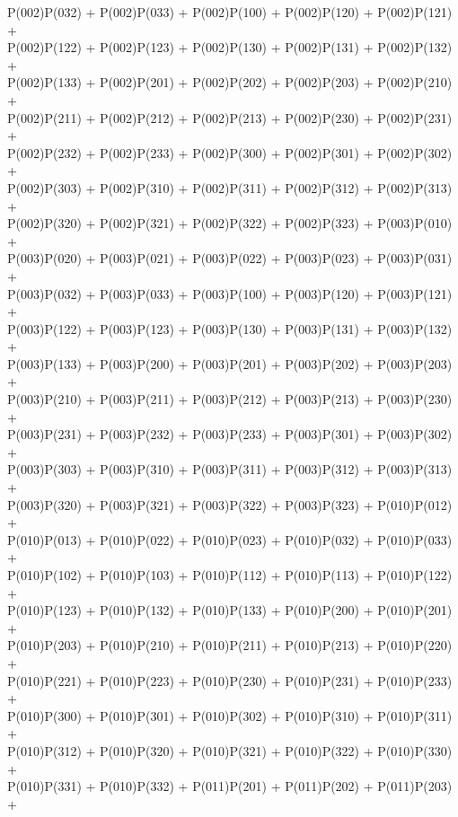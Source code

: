 P(002)P(032) + P(002)P(033) + P(002)P(100) + P(002)P(120) + P(002)P(121) +\\
P(002)P(122) + P(002)P(123) + P(002)P(130) + P(002)P(131) + P(002)P(132) +\\
P(002)P(133) + P(002)P(201) + P(002)P(202) + P(002)P(203) + P(002)P(210) +\\
P(002)P(211) + P(002)P(212) + P(002)P(213) + P(002)P(230) + P(002)P(231) +\\
P(002)P(232) + P(002)P(233) + P(002)P(300) + P(002)P(301) + P(002)P(302) +\\
P(002)P(303) + P(002)P(310) + P(002)P(311) + P(002)P(312) + P(002)P(313) +\\
P(002)P(320) + P(002)P(321) + P(002)P(322) + P(002)P(323) + P(003)P(010) +\\
P(003)P(020) + P(003)P(021) + P(003)P(022) + P(003)P(023) + P(003)P(031) +\\
P(003)P(032) + P(003)P(033) + P(003)P(100) + P(003)P(120) + P(003)P(121) +\\
P(003)P(122) + P(003)P(123) + P(003)P(130) + P(003)P(131) + P(003)P(132) +\\
P(003)P(133) + P(003)P(200) + P(003)P(201) + P(003)P(202) + P(003)P(203) +\\
P(003)P(210) + P(003)P(211) + P(003)P(212) + P(003)P(213) + P(003)P(230) +\\
P(003)P(231) + P(003)P(232) + P(003)P(233) + P(003)P(301) + P(003)P(302) +\\
P(003)P(303) + P(003)P(310) + P(003)P(311) + P(003)P(312) + P(003)P(313) +\\
P(003)P(320) + P(003)P(321) + P(003)P(322) + P(003)P(323) + P(010)P(012) +\\
P(010)P(013) + P(010)P(022) + P(010)P(023) + P(010)P(032) + P(010)P(033) +\\
P(010)P(102) + P(010)P(103) + P(010)P(112) + P(010)P(113) + P(010)P(122) +\\
P(010)P(123) + P(010)P(132) + P(010)P(133) + P(010)P(200) + P(010)P(201) +\\
P(010)P(203) + P(010)P(210) + P(010)P(211) + P(010)P(213) + P(010)P(220) +\\
P(010)P(221) + P(010)P(223) + P(010)P(230) + P(010)P(231) + P(010)P(233) +\\
P(010)P(300) + P(010)P(301) + P(010)P(302) + P(010)P(310) + P(010)P(311) +\\
P(010)P(312) + P(010)P(320) + P(010)P(321) + P(010)P(322) + P(010)P(330) +\\
P(010)P(331) + P(010)P(332) + P(011)P(201) + P(011)P(202) + P(011)P(203) +\\
